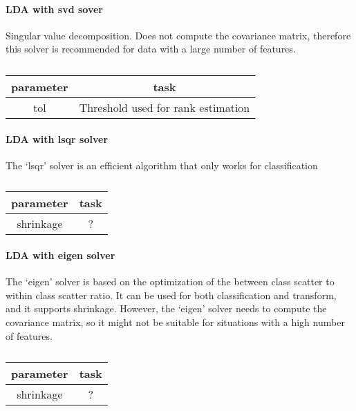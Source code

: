 \paragraph{LDA with svd sover}
Singular value decomposition. Does not compute the
covariance matrix, therefore this solver is recommended for data with
a large number of features.
%
\begin{table}[h!]
  \centering
  \begin{tabular}{c|c}
    parameter & task \\
    \hline\hline
    tol       & Threshold used for rank estimation \\
    \hline
  \end{tabular}
  \caption{}
  \label{tab:svd_parameters}
\end{table}
%

\paragraph{LDA with lsqr solver}
The ‘lsqr’ solver is an efficient algorithm that only works for classification
%
\begin{table}[h!]
  \centering
  \begin{tabular}{c|c}
    parameter & task \\
    \hline\hline
    shrinkage & ? \\
    \hline
  \end{tabular}
  \caption{}
  \label{tab:svd_parameters}
\end{table}
%

\paragraph{LDA with eigen solver}
The ‘eigen’ solver is based on the optimization of the between class
scatter to within class scatter ratio. It can be used for both
classification and transform, and it supports shrinkage. However, the
‘eigen’ solver needs to compute the covariance matrix, so it might not
be suitable for situations with a high number of features.
%
\begin{table}[h!]
  \centering
  \begin{tabular}{c|c}
    parameter & task \\
    \hline\hline
    shrinkage & ? \\
    \hline
  \end{tabular}
  \caption{}
  \label{tab:svd_parameters}
\end{table}
%

